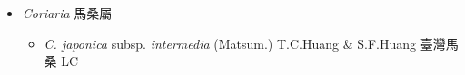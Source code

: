 
  \begin{itemize}
 \item[] \textit{Coriaria} 馬桑屬
                                
  \begin{itemize}
        \item[] \textit{C. japonica} subsp. \textit{intermedia} (Matsum.) T.C.Huang \& S.F.Huang  臺灣馬桑   LC
  \end{itemize}
  \end{itemize}
